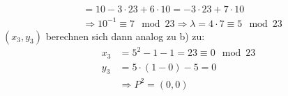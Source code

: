 \documentclass[DIN, pagenumber=false, fontsize=11pt, parskip=half]{scrartcl}
\newcommand{\congTo}[3][]{\stackrel{#1}{\equiv} #2\mod #3}
\begin{document}
\begin{enumerate}[label=\alph*)]
\begin{align*}
                  &= 10 - 3 \cdot 23 + 6 \cdot 10 = -3 \cdot 23 + 7 \cdot 10 \\
                  &\Rightarrow 10^{-1} \congTo{7}{23} \Rightarrow \lambda = 4 \cdot 7 \congTo{5}{23}
              \end{align*}
              $(x_3, y_3)$ berechnen sich dann analog zu b) zu:
              \begin{align*}
                  x_3 &= 5^2 - 1 - 1 = 23 \congTo{0}{23} \\
                  y_3 &= 5 \cdot (1 - 0) - 5 = 0 \\
                  &\Rightarrow P^2 = (0, 0)
              \end{align*}
    \end{enumerate}
\end{document}
